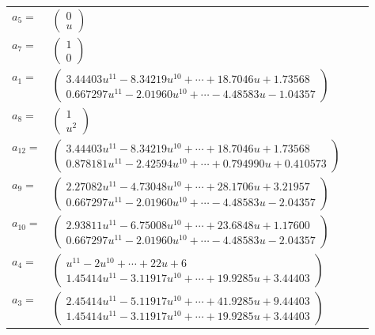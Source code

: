 \documentclass[1p]{elsarticle_modified}
\theoremstyle{definition}
\begin{document}
\begin{tabular}{m{7pt} m{180pt} m{7pt} m{180pt} }
\flushright $a_{5}=$&$\begin{pmatrix}0\\u\end{pmatrix}$ \\
\flushright $a_{7}=$&$\begin{pmatrix}1\\0\end{pmatrix}$ \\
\flushright $a_{1}=$&$\begin{pmatrix}3.44403 u^{11}-8.34219 u^{10}+\cdots+18.7046 u+1.73568\\0.667297 u^{11}-2.01960 u^{10}+\cdots-4.48583 u-1.04357\end{pmatrix}$ \\
\flushright $a_{8}=$&$\begin{pmatrix}1\\u^2\end{pmatrix}$ \\
\flushright $a_{12}=$&$\begin{pmatrix}3.44403 u^{11}-8.34219 u^{10}+\cdots+18.7046 u+1.73568\\0.878181 u^{11}-2.42594 u^{10}+\cdots+0.794990 u+0.410573\end{pmatrix}$ \\
\flushright $a_{9}=$&$\begin{pmatrix}2.27082 u^{11}-4.73048 u^{10}+\cdots+28.1706 u+3.21957\\0.667297 u^{11}-2.01960 u^{10}+\cdots-4.48583 u-2.04357\end{pmatrix}$ \\
\flushright $a_{10}=$&$\begin{pmatrix}2.93811 u^{11}-6.75008 u^{10}+\cdots+23.6848 u+1.17600\\0.667297 u^{11}-2.01960 u^{10}+\cdots-4.48583 u-2.04357\end{pmatrix}$ \\
\flushright $a_{4}=$&$\begin{pmatrix}u^{11}-2 u^{10}+\cdots+22 u+6\\1.45414 u^{11}-3.11917 u^{10}+\cdots+19.9285 u+3.44403\end{pmatrix}$ \\
\flushright $a_{3}=$&$\begin{pmatrix}2.45414 u^{11}-5.11917 u^{10}+\cdots+41.9285 u+9.44403\\1.45414 u^{11}-3.11917 u^{10}+\cdots+19.9285 u+3.44403\end{pmatrix}$ \\

\end{tabular}
\end{document}
